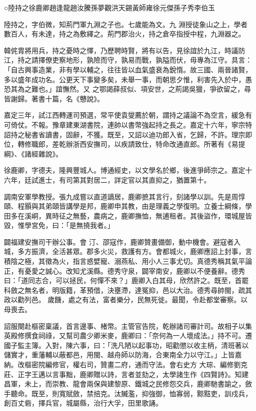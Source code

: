 
\begin{pinyinscope}

 ○陸持之徐鹿卿趙逢龍趙汝騰孫夢觀洪天錫黃師雍徐元傑孫子秀李伯玉



 陸持之，字伯微，知荊門軍九淵之子也。七歲能為文。九
 淵授徒象山之上，學者數百人，有未達，持之為敷繹之。荊門郡治火，持之倉卒指授中程，九淵器之。



 韓侂胄將用兵，持之憂時之懌，乃歷聘時賢，將有以告，見徐誼於九江，時議防江，持之請擇僚吏察地形，孰險而守，孰易而戰，孰隘而伏，毋專為江守。具言：「自古興事造業，非有學以輔之，往往皆以血氣盛衰為銳惰。故三國、兩晉諸賢，多以盛年成功名。公更天下事變多矣，未舉一事，而朝思夕惟，利害先入於中，愚恐其為之難也。」誼憮然。又
 之鄂謁薛叔似、項安世，之荊謁吳獵，爭欲留之，尋皆謝歸。著書十篇，名《戇說》。



 嘉定三年，試江西轉運司預選，常平使袁燮薦於朝，謂持之議論不為空言，緩急有可倚仗。不報。豫章建東湖書院，連帥以書幣強起持之長之。嘉定十六年，寧宗特詔持之秘書省讀書，固辭，不獲。既至，又詔以迪功郎入省，乞歸，不許。理宗即位，轉修職郎，差乾辦浙西安撫司，以疾請致仕，特命改通直郎。所著有《易提綱》、《諸經雜說》。



 徐鹿卿，字德夫，隆興豐城人。博通經史，以文學名於鄉，後進爭師宗之。嘉定十六年，廷試進士，有司第其對居二，詳定官以其直抑之，猶置第十。



 調南安軍學教授。張九成嘗以直道謫居，鹿卿摭其言行，刻諸學以訓。先是周惇頤、程顥與其弟頤皆講學是邦，鹿卿申其教，由是理義之學復明。立養士綱條，學田多在溪峒，異時征之無藝，農病之，鹿卿撫恤，無逋租者。其後盜作，環城屋皆毀，惟學宮免，曰：「是無撓我者。」



 闢福建安撫司干辦公事。會
 汀、邵寇作，鹿卿贊畫備御，動中機會。避寇者入城，多方振濟，全活甚眾。郡多火災，救護有方。會都城火，鹿卿應詔上封事，言積陰之極，其徵為火，指言惑嬖寵、溺燕私、用小人三事尤切。真德秀稱其氣平論正，有憂愛之誠心。改知尤溪縣。德秀守泉，闢宰南安，鹿卿以不便養辭。德秀曰：「道同志合，可以拯民，何憚不來？」鹿卿入白其母，欣然許之。既至，首罷科斂之無名者，明版籍，革預借，決壅滯，達冤抑，邑以大治。德秀尋帥閩，疏其政以勸列邑。
 歲饑，處之有法，富者樂分，民無死徙。最聞，令赴都堂審察。以母喪去。



 詔服闋赴樞密稟議，首言邊事、楮幣。主管官告院，乾辦諸司審計司。故相子以集英殿修撰食祠祿，又幫司農少卿米麥，鹿卿曰：「奈何為一人壞成法。」持不可。遷國子監主簿。入對，陳六事，曰：「洗凡陋以起事功，昭勸懲以收主柄，清班著以儲實才，重藩輔以蔽都邑，用閩、越舟師以防海，合東南全力以守江。」上皆嘉納。改樞密院編修官，權右司，贊畫二府，通而守法。會右史方
 大琮、編修劉克莊、正字王邁以言事黜，鹿卿贈以詩，言者並劾之，太學諸生作《四賢詩》。知建昌軍，未上，而崇教、龍會兩保與建黎原、鐵城之民修怨交兵，鹿卿馳書諭之，斂手聽命。既至，則寬賦斂，禁掊克。汰贓濫，抑強御，恤寡弱，黥黠吏，訓戍兵，創百丈砦，擇兵官，城屬縣，治行大孚，田里歌誦。




\end{pinyinscope}
